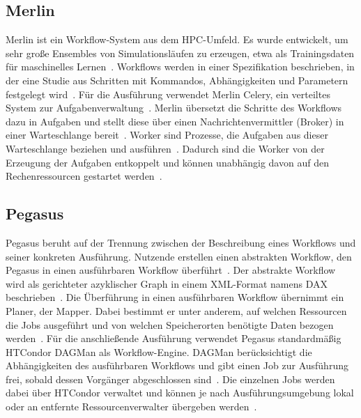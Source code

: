 \subsection{Merlin}
\label{sec:basics:merlin}
Merlin ist ein Workflow-System aus dem HPC-Umfeld. Es wurde
entwickelt, um sehr große Ensembles von Simulationsläufen zu
erzeugen, etwa als Trainingsdaten für maschinelles
Lernen~\cite[S.~255\,f.]{peterson2022merlin}. Workflows werden in
einer Spezifikation beschrieben, in der eine Studie aus Schritten
mit Kommandos, Abhängigkeiten und Parametern festgelegt
wird~\cite[S.~258]{peterson2022merlin}.
Für die Ausführung verwendet Merlin Celery, ein verteiltes System zur
Aufgabenverwaltung~\cite[S.~258]{peterson2022merlin}\cite{merlindocs-configuration}. Merlin übersetzt die Schritte des Workflows dazu in Aufgaben und stellt diese über einen Nachrichtenvermittler (Broker) in einer
Warteschlange bereit~\cite[S.~258]{peterson2022merlin}\cite{merlindocs-configuration}. Worker sind Prozesse, die Aufgaben aus dieser Warteschlange
beziehen und ausführen~\cite[S.~258]{peterson2022merlin}\cite{merlindocs-configuration}. Dadurch sind die Worker von der Erzeugung der Aufgaben entkoppelt und können unabhängig davon auf den Rechenressourcen gestartet
werden~\cite[S.~261]{peterson2022merlin}.


\subsection{Pegasus}
\label{sec:basics:pegasus}
Pegasus beruht auf der Trennung zwischen der Beschreibung eines
Workflows und seiner konkreten Ausführung. Nutzende erstellen
einen abstrakten Workflow, den Pegasus in einen ausführbaren
Workflow überführt~\cite[S.~18]{deelman2015pegasus}. Der abstrakte
Workflow wird als gerichteter azyklischer Graph in einem
XML-Format namens DAX beschrieben~\cite[S.~19]{deelman2015pegasus}. Die Überführung in einen ausführbaren Workflow übernimmt ein Planer, der Mapper.
Dabei bestimmt er unter anderem, auf welchen Ressourcen die Jobs
ausgeführt und von welchen Speicherorten benötigte Daten bezogen
werden~\cite[S.~20]{deelman2015pegasus}. Für die anschließende
Ausführung verwendet Pegasus standardmäßig HTCondor DAGMan als
Workflow-Engine. DAGMan berücksichtigt die Abhängigkeiten des
ausführbaren Workflows und gibt einen Job zur Ausführung frei,
sobald dessen Vorgänger abgeschlossen
sind~\cite[S.~20]{deelman2015pegasus}. Die einzelnen Jobs werden
dabei über HTCondor verwaltet und können je nach
Ausführungsumgebung lokal oder an entfernte Ressourcenverwalter
übergeben werden~\cite[S.~20]{deelman2015pegasus}.

